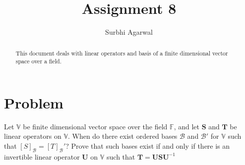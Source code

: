 \documentclass[journal,12pt,twocolumn]{IEEEtran}
\begin{document}
\let\StandardTheFigure\thefigure
\let\vec\mathbf

\renewcommand{\thefigure}{\theproblem}

\def\putbox#1#2#3{\makebox[0in][l]{\makebox[#1][l]{}\raisebox{\baselineskip}[0in][0in]{\raisebox{#2}[0in][0in]{#3}}}}
     \def\rightbox#1{\makebox[0in][r]{#1}}
     \def\centbox#1{\makebox[0in]{#1}}
     \def\topbox#1{\raisebox{-\baselineskip}[0in][0in]{#1}}
     \def\midbox#1{\raisebox{-0.5\baselineskip}[0in][0in]{#1}}
\vspace{3cm}

\title{Assignment 8}
\author{Surbhi Agarwal}

\maketitle

\newpage


\bigskip

\renewcommand{\thefigure}{\theenumi}
\renewcommand{\thetable}{\theenumi}

\begin{abstract}
This document deals with linear operators and basis of a finite dimensional vector space over a field.
\end{abstract}

\section{Problem}
Let $\mathbb V$ be finite dimensional vector space over the field $\mathbb F$, and let $\vec{S}$ and $\vec{T}$ be linear operators on $\mathbb V$. When do there exist ordered bases $\mathcal{B}$ and $\mathcal{B'}$ for $\mathbb V$ such that $[S]_\mathcal{B} = [T]_\mathcal{B}'$? Prove that such bases exist if and only if there is an invertible linear operator $\vec{U}$ on $\mathbb V$ such that $\vec{T} = \vec{U}\vec{S}\vec{U}^{-1}$
\end{document}
